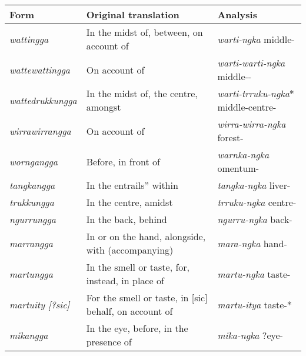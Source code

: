 \begin{table}[b]
	\small
    \begin{tabularx}{\textwidth}{lp{6cm}Q}
        \lsptoprule
        Form & Original translation &  Analysis \\
        \midrule 
        \textit{wattingga} & In the midst of, between, on account of & \textit{warti-ngka} \newline middle-\\
        \textit{wattewattingga} & On account of & \textit{warti-warti-ngka} \newline middle--\\
        \textit{wattedrukkungga} & In the midst of, the centre, amongst & \textit{warti-trruku-ngka}* \newline middle-centre-\\
        \textit{wirrawirrangga} & On account of & \textit{wirra-wirra-ngka} \newline forest-\\
        \textit{worngangga} & Before, in front of & \textit{warnka-ngka} \newline omentum-\\
        \textit{tangkangga} & In the entrails” within & \textit{tangka-ngka} \newline liver-\\
        \textit{trukkungga} & In the centre, amidst & \textit{trruku-ngka} \newline centre-\\
        \textit{ngurrungga} & In the back, behind & \textit{ngurru-ngka} \newline back-\\
        \textit{marrangga} & In or on the hand, alongside, with (accompanying) & \textit{mara-ngka} \newline hand-\\
        \textit{martungga} & In the smell or taste, for, instead, in place of & \textit{martu-ngka} \newline taste-\\
        \textit{martuity [?sic]} & For the smell or taste, in [sic] behalf, on account of & \textit{martu-itya} \newline taste-*\\
        \textit{mikangga} & In the eye, before, in the presence of & \textit{mika-ngka} \newline ?eye-\\

\end{tabularx}
\end{table}

